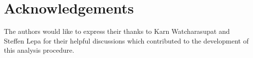 \documentclass[
  authoryear,
  preprint,
  3p]{elsarticle}
\begin{document}
\section*{Acknowledgements}\label{acknowledgements}

The authors would like to express their thanks to Karn Watcharasupat and
Steffen Lepa for their helpful discussions which contributed to the
development of this analysis procedure.


  
\end{document}
